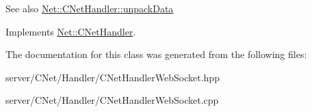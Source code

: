 \begin{DoxySeeAlso}{See also}
\mbox{\hyperlink{class_net_1_1_c_net_handler_aea2d09ea3bfa8d7a13ace3aec6ba9356}{Net\+::\+C\+Net\+Handler\+::unpack\+Data}} 
\end{DoxySeeAlso}


Implements \mbox{\hyperlink{class_net_1_1_c_net_handler_aea2d09ea3bfa8d7a13ace3aec6ba9356}{Net\+::\+C\+Net\+Handler}}.



The documentation for this class was generated from the following files\+:\begin{DoxyCompactItemize}
\item 
server/\+C\+Net/\+Handler/C\+Net\+Handler\+Web\+Socket.\+hpp\item 
server/\+C\+Net/\+Handler/C\+Net\+Handler\+Web\+Socket.\+cpp\end{DoxyCompactItemize}
